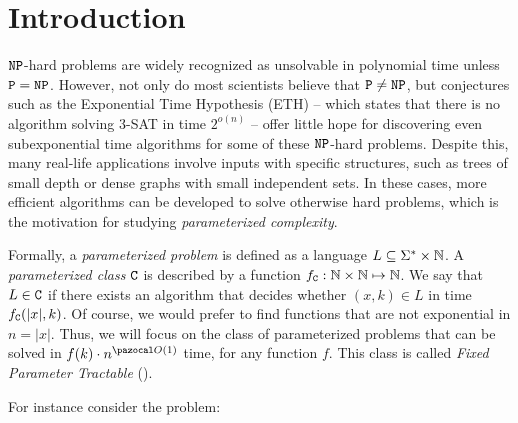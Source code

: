 \section{Introduction}
\label{section:introduction}

$\texttt{NP}$-hard problems are widely recognized as unsolvable in polynomial time unless $\texttt{P} = \texttt{NP}$. However, not only do most scientists believe that $\texttt{P} \neq \texttt{NP}$, but conjectures such as the Exponential Time Hypothesis (ETH) -- which states that there is no algorithm solving 3-SAT in time $2^{o(n)}$ -- \cite{impagliazzo2001complexity} offer little hope for discovering even subexponential time algorithms for some of these $\texttt{NP}$-hard problems. Despite this, many real-life applications involve inputs with specific structures, such as trees of small depth or dense graphs with small independent sets. In these cases, more efficient algorithms can be developed to solve otherwise hard problems, which is the motivation for studying \textit{parameterized complexity}.

Formally, a \textit{parameterized problem} is defined as a language $L \subseteq \Sigma^* \times \mathbb{N}$.
A \textit{parameterized class} $\texttt{C}$ is described by a function $f_{\texttt{C}} : \mathbb{N} \times \mathbb{N} \mapsto \mathbb{N}$. We say that $L \in \texttt{C}$ if there exists an algorithm that decides whether $(x, k) \in L$ in time $f_{\texttt{C}}(|x|, k)$. Of course, we would prefer to find functions that are not exponential in $n = |x|$. Thus, we will focus on the class of parameterized problems that can be solved in $f(k)\cdot n^{\O(1)}$ time, for any function $f$. This class is called \textit{Fixed Parameter Tractable} ().

\medskip

For instance consider the  problem:

\begin{problem}
\end{problem}

